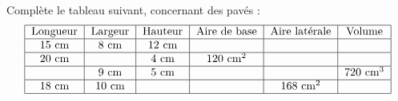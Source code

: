Complète le tableau suivant, concernant des pavés :
\renewcommand{\arraystretch}{1.5}
\[\begin{tabular}{|c|c|c|c|c|c|}
\hline
Longueur&Largeur&Hauteur&Aire de base&Aire latérale&Volume\\
\hline
15~cm&8~cm&12~cm&&&\\
\hline
20~cm&&4~cm&120~cm$^2$&&\\
\hline
&9~cm&5~cm&&&720~cm$^3$\\
\hline
18~cm&10~cm&&&168~cm$^2$&\\
\hline
\end{tabular}
\]
\renewcommand{\arraystretch}{1}
